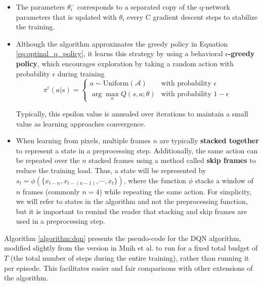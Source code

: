 \begin{itemize}
    \item The parameters $\theta^-_{i}$ corresponds to a separated copy of the q-network parameters that is updated with $\theta_{i}$ every C gradient descent steps to stabilize the training.
    \item Although the algorithm approximates the greedy policy in Equation \ref{eq:optinal_q_policy}, it learns this strategy by using a behavioral \textbf{$\epsilon$-greedy policy}, which encourages exploration by taking a random action with probability $\epsilon$ during training 
    \begin{equation}
        \pi^\epsilon(a | s) = 
        \begin{cases} 
        a \sim \text{Uniform}(\mathcal{A}) & \text{with probability } \epsilon \\
        \arg\max_{a} Q(s, a; \theta) & \text{with probability } 1 - \epsilon
        \end{cases}
    \end{equation}
    
    Typically, this epsilon value is annealed over iterations to maintain a small value as learning approaches convergence.
    \item When learning from pixels, multiple frames $n$ are typically \textbf{stacked together} to represent a state in a preprocessing step. Additionally, the same action can be repeated over the $n$ stacked frames using a method called \textbf{skip frames} to reduce the training load. Thus, a state will be represented by $s_{t} = \phi(\{x_{t-n}, x_{t-(n-1)}, \cdots, x_{t}\})$, where the function $\phi$ stacks a window of $n$ frames (commonly $n=4$) while repeating the same action. For simplicity, we will refer to states in the algorithm and not the preprocessing function, but it is important to remind the reader that stacking and skip frames are used in a preprocessing step.
\end{itemize}

Algorithm \ref{algorithm:dqn} presents the pseudo-code for the DQN algorithm, modified slightly from the version in Mnih et al. \cite{mnih2013playing, mnih2015human} to run for a fixed total budget of $T$ (the total number of steps during the entire training), rather than running it per episode. This facilitates easier and fair comparisons with other extensions of the algorithm.

